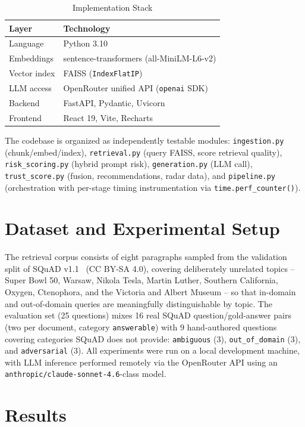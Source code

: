 \documentclass[conference]{IEEEtran}
\begin{document}
\begin{table}[htbp]
\caption{Implementation Stack}
\label{tab:stack}
\centering
\begin{tabular}{ll}
\toprule
\textbf{Layer} & \textbf{Technology} \\
\midrule
Language & Python 3.10 \\
Embeddings & sentence-transformers (all-MiniLM-L6-v2) \\
Vector index & FAISS (\texttt{IndexFlatIP}) \\
LLM access & OpenRouter unified API (\texttt{openai} SDK) \\
Backend & FastAPI, Pydantic, Uvicorn \\
Frontend & React 19, Vite, Recharts \\
\bottomrule
\end{tabular}
\end{table}

The codebase is organized as independently testable modules:
\texttt{ingestion.py} (chunk/embed/index), \texttt{retrieval.py} (query FAISS, score
retrieval quality), \texttt{risk\_scoring.py} (hybrid prompt risk), \texttt{generation.py}
(LLM call), \texttt{trust\_score.py} (fusion, recommendations, radar data), and
\texttt{pipeline.py} (orchestration with per-stage timing instrumentation via
\texttt{time.perf\_counter()}).

\section{Dataset and Experimental Setup}

The retrieval corpus consists of eight paragraphs sampled from the validation split of
SQuAD v1.1~\cite{rajpurkar2016squad} (CC BY-SA 4.0), covering deliberately unrelated
topics -- Super Bowl 50, Warsaw, Nikola Tesla, Martin Luther, Southern California,
Oxygen, Ctenophora, and the Victoria and Albert Museum -- so that in-domain and
out-of-domain queries are meaningfully distinguishable by topic. The evaluation set
(25 questions) mixes 16 real SQuAD question/gold-answer pairs (two per document,
category \texttt{answerable}) with 9 hand-authored questions covering categories SQuAD
does not provide: \texttt{ambiguous} (3), \texttt{out\_of\_domain} (3), and
\texttt{adversarial} (3). All experiments were run on a local development machine, with
LLM inference performed remotely via the OpenRouter API using an
\texttt{anthropic/claude-sonnet-4.6}-class model.

\section{Results}
\end{document}

